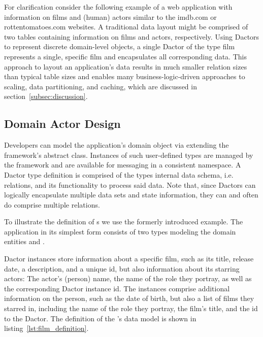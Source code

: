 For clarification consider the following example of a web application with information on films and (human) actors similar to the imdb.com or rottentomatoes.com websites.
A traditional data layout might be comprised of two tables containing information on films and actors, respectively.
Using Dactors to represent discrete domain-level objects, a single Dactor of the type film represents a single, specific film and encapsulates all corresponding data.
This approach to layout an application's data results in much smaller relation sizes than typical table sizes and enables many business-logic-driven approaches to scaling, data partitioning, and caching, which are discussed in section~\ref{subsec:discussion}.

\subsection{Domain Actor Design}\label{subsec:domain_actor_design}

Developers can model the application's domain object via extending the framework's abstract  class.
Instances of such user-defined  types are managed by the framework and are available for messaging in a consistent namespace.
A Dactor type definition is comprised of the types internal data schema, i.e. relations, and its functionality to process said data.
Note that, since Dactors can logically encapsulate multiple data sets and state information, they can and often do comprise multiple relations.

To illustrate the definition of s we use the formerly introduced example.
The application in its simplest form consists of two  types modeling the domain entities  and .

 Dactor instances store information about a specific film, such as its title, release date, a description, and a unique id, but also information about its starring actors:
The actor's (person) name, the name of the role they portray, as well as the corresponding Dactor instance id.
The  instances comprise additional information on the person, such as the date of birth, but also a list of films they starred in, including the name of the role they portray, the film's title, and the id to the  Dactor.
The definition of the 's data model is shown in listing~\ref{lst:film_definition}.

